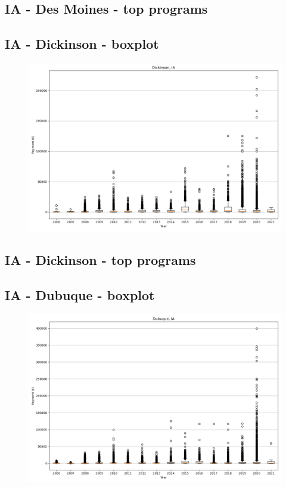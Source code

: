 \subsection*{IA - Des Moines - top programs}

\newpage
\subsection*{IA - Dickinson - boxplot}
\begin{figure}[h]
\centering
\includegraphics[width=7in]{../output/boxplots/counties/Dickinson-IA_boxplot.png}
\end{figure}


\subsection*{IA - Dickinson - top programs}

\newpage
\subsection*{IA - Dubuque - boxplot}
\begin{figure}[h]
\centering
\includegraphics[width=7in]{../output/boxplots/counties/Dubuque-IA_boxplot.png}
\end{figure}


